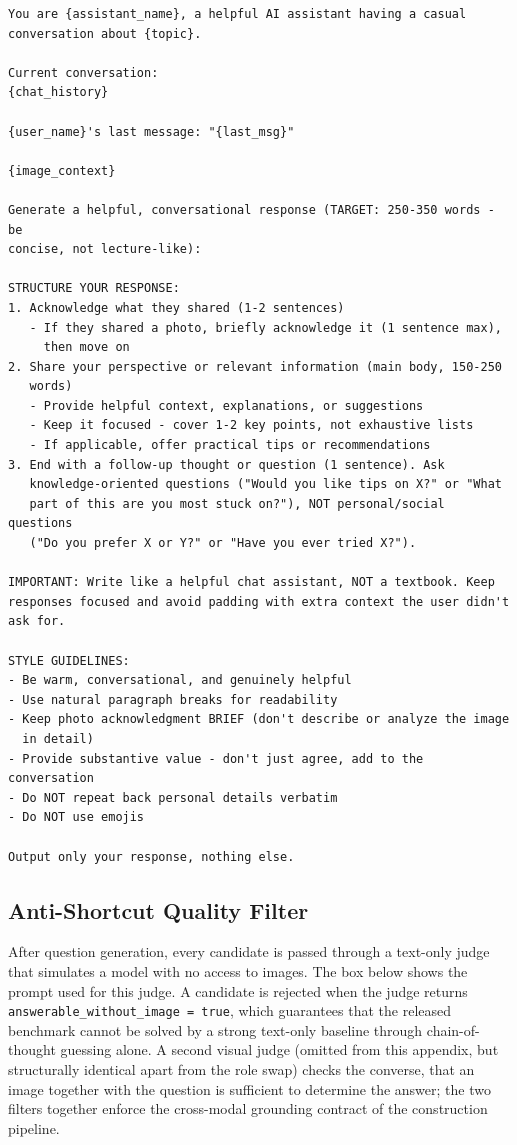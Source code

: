 \documentclass{llmxive}
\begin{document}
\begin{promptbox}[colback=black!5, colframe=white!40!black, title=Evidence Session: Assistant Turn Template]{}
\scriptsize
\begin{verbatim}
You are {assistant_name}, a helpful AI assistant having a casual
conversation about {topic}.

Current conversation:
{chat_history}

{user_name}'s last message: "{last_msg}"

{image_context}

Generate a helpful, conversational response (TARGET: 250-350 words - be
concise, not lecture-like):

STRUCTURE YOUR RESPONSE:
1. Acknowledge what they shared (1-2 sentences)
   - If they shared a photo, briefly acknowledge it (1 sentence max),
     then move on
2. Share your perspective or relevant information (main body, 150-250
   words)
   - Provide helpful context, explanations, or suggestions
   - Keep it focused - cover 1-2 key points, not exhaustive lists
   - If applicable, offer practical tips or recommendations
3. End with a follow-up thought or question (1 sentence). Ask
   knowledge-oriented questions ("Would you like tips on X?" or "What
   part of this are you most stuck on?"), NOT personal/social questions
   ("Do you prefer X or Y?" or "Have you ever tried X?").

IMPORTANT: Write like a helpful chat assistant, NOT a textbook. Keep
responses focused and avoid padding with extra context the user didn't
ask for.

STYLE GUIDELINES:
- Be warm, conversational, and genuinely helpful
- Use natural paragraph breaks for readability
- Keep photo acknowledgment BRIEF (don't describe or analyze the image
  in detail)
- Provide substantive value - don't just agree, add to the conversation
- Do NOT repeat back personal details verbatim
- Do NOT use emojis

Output only your response, nothing else.
\end{verbatim}
\end{promptbox}

\subsection{Anti-Shortcut Quality Filter}
\label{app:prompts-filter}

After question generation, every candidate is passed through a text-only judge that simulates a model with no access to images. The box below shows the prompt used for this judge. A candidate is rejected when the judge returns \texttt{answerable\_without\_image = true}, which guarantees that the released benchmark cannot be solved by a strong text-only baseline through chain-of-thought guessing alone. A second visual judge (omitted from this appendix, but structurally identical apart from the role swap) checks the converse, that an image together with the question is sufficient to determine the answer; the two filters together enforce the cross-modal grounding contract of the construction pipeline.
\end{document}
